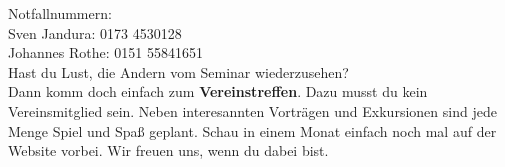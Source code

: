Notfallnummern: \\
Sven Jandura: 0173 4530128 \\
Johannes Rothe: 0151 55841651 \\

\large Hast du Lust, die Andern vom Seminar wiederzusehen?\\
\normalsize Dann komm doch einfach zum \textbf{Vereinstreffen}. Dazu musst du kein Vereinsmitglied sein. Neben interesannten Vorträgen und Exkursionen sind jede Menge Spiel und Spaß geplant. Schau in einem Monat einfach noch mal auf der Website vorbei. Wir freuen uns, wenn du dabei bist.  

